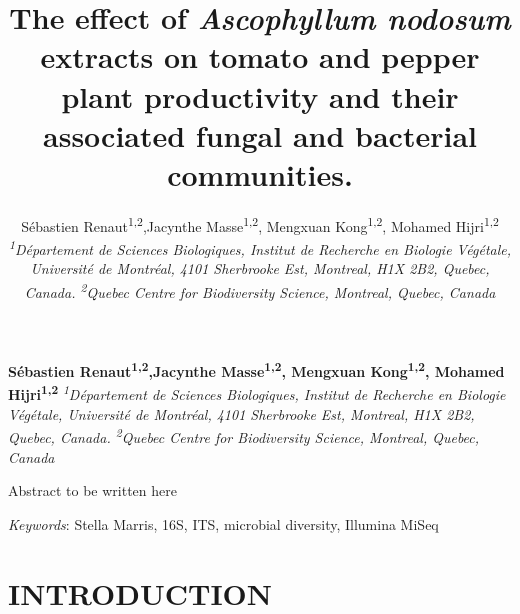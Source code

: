 \documentclass[11pt,]{article}
\title{\textbf{The effect of \emph{Ascophyllum nodosum} extracts on tomato and
pepper plant productivity and their associated fungal and bacterial
communities.}  }
\author{\Large Sébastien Renaut\textsuperscript{1,2},Jacynthe
Masse\textsuperscript{1,2}, Mengxuan Kong\textsuperscript{1,2}, Mohamed
Hijri\textsuperscript{1,2}\vspace{0.05in} \newline\normalsize\emph{\textsuperscript{1}Département de Sciences Biologiques, Institut de
Recherche en Biologie Végétale, Université de Montréal, 4101 Sherbrooke
Est, Montreal, H1X 2B2, Quebec, Canada. \textsuperscript{2}Quebec Centre
for Biodiversity Science, Montreal, Quebec, Canada}  }
\date{}
\newcommand*{\authorfont}{\fontfamily{phv}\selectfont}
\renewenvironment{abstract}
 {{%
    \setlength{\leftmargin}{0mm}
    \setlength{\rightmargin}{\leftmargin}%
  }%
  \relax}
 {\endlist}
\begin{document}
	
%

{%
\setlength{\parindent}{0pt}
\thispagestyle{plain}
{\fontsize{18}{20}\selectfont\raggedright 
\maketitle  %

}

{
   \vskip 13.5pt\relax \normalsize\fontsize{11}{12} 
\textbf{\authorfont Sébastien Renaut\textsuperscript{1,2},Jacynthe
Masse\textsuperscript{1,2}, Mengxuan Kong\textsuperscript{1,2}, Mohamed
Hijri\textsuperscript{1,2}} \hskip 15pt \emph{\small \textsuperscript{1}Département de Sciences Biologiques, Institut de
Recherche en Biologie Végétale, Université de Montréal, 4101 Sherbrooke
Est, Montreal, H1X 2B2, Quebec, Canada. \textsuperscript{2}Quebec Centre
for Biodiversity Science, Montreal, Quebec, Canada}   

}

}








\begin{abstract}

    \hbox{\vrule height .2pt width 39.14pc}

    \vskip 8.5pt %

\noindent Abstract to be written here


\vskip 8.5pt \noindent \emph{Keywords}: Stella Marris, 16S, ITS, microbial diversity, Illumina MiSeq \par

    \hbox{\vrule height .2pt width 39.14pc}



\end{abstract}


\vskip 6.5pt


\noindent \doublespacing \newpage 

\section{INTRODUCTION}\label{introduction}
\end{document}

